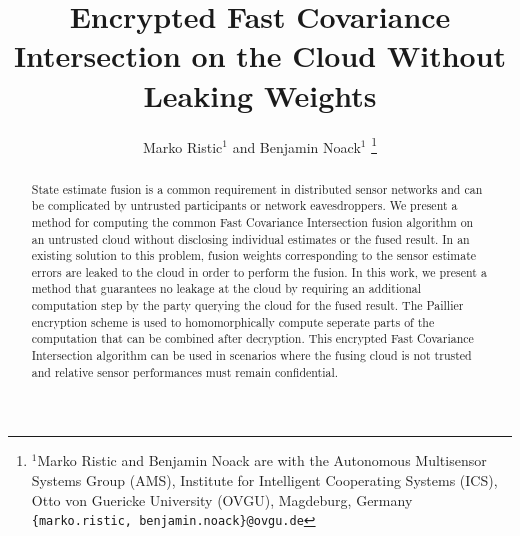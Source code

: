 \documentclass[letterpaper, 10 pt, conference]{ieeeconf}
\title{\LARGE \bf
Encrypted Fast Covariance Intersection on the Cloud Without Leaking Weights
}
\author{Marko Ristic$^{1}$ and Benjamin Noack$^{1}$%
\thanks{$^{1}$Marko Ristic and Benjamin Noack are with the Autonomous Multisensor Systems Group (AMS), Institute for Intelligent Cooperating Systems (ICS), Otto von Guericke University (OVGU), Magdeburg, Germany {\tt\small \{marko.ristic, benjamin.noack\}@ovgu.de}}%
}
\begin{document}
\maketitle
\thispagestyle{empty}
\pagestyle{empty}

% 
%                                    
%                                    
%                                    
% 
\begin{abstract}
    State estimate fusion is a common requirement in distributed sensor networks and can be complicated by untrusted participants or network eavesdroppers. We present a method for computing the common Fast Covariance Intersection fusion algorithm on an untrusted cloud without disclosing individual estimates or the fused result. In an existing solution to this problem, fusion weights corresponding to the sensor estimate errors are leaked to the cloud in order to perform the fusion. In this work, we present a method that guarantees no leakage at the cloud by requiring an additional computation step by the party querying the cloud for the fused result. The Paillier encryption scheme is used to homomorphically compute seperate parts of the computation that can be combined after decryption. This encrypted Fast Covariance Intersection algorithm can be used in scenarios where the fusing cloud is not trusted and relative sensor performances must remain confidential.
\end{abstract}


% 
%                                                        
%                                                        
%                                                        
% 
\end{document}

